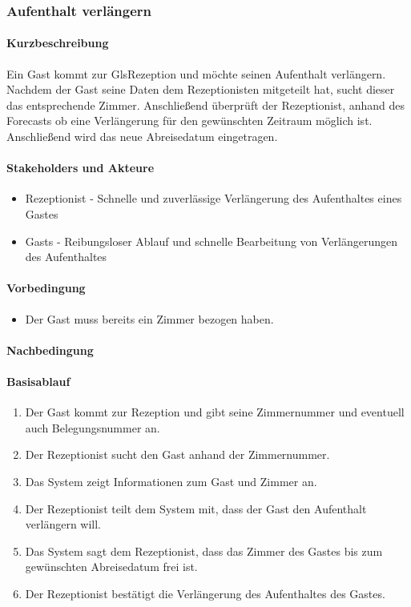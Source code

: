 \subsubsection{Aufenthalt verlängern}

\paragraph{Kurzbeschreibung}
Ein \Gls{Gast} kommt zur Gls{Rezeption} und möchte seinen Aufenthalt verlängern. Nachdem der \Gls{Gast} seine Daten dem \Gls{Rezeptionist}en mitgeteilt hat, sucht dieser das entsprechende Zimmer. Anschließend überprüft der \Gls{Rezeption}ist, anhand des Forecasts ob eine Verlängerung für den gewünschten Zeitraum möglich ist. Anschließend wird das neue Abreisedatum eingetragen.

\paragraph{Stakeholders und Akteure}
\begin{itemize}
\item \Gls{Rezeptionist} - Schnelle und zuverlässige Verlängerung des Aufenthaltes eines \Gls{Gast}es
\item \Glspl{Gast} - Reibungsloser Ablauf und schnelle Bearbeitung von Verlängerungen des Aufenthaltes
\end{itemize}

\paragraph{Vorbedingung}
\begin{itemize}
\item Der \Gls{Gast} muss bereits ein Zimmer bezogen haben.
\end{itemize}

\paragraph{Nachbedingung}

\paragraph{Basisablauf}
\begin{enumerate}
\item Der \Gls{Gast} kommt zur \Gls{Rezeption} und gibt seine \Gls{Zimmernummer} und eventuell auch \Gls{Belegungsnummer} an.
\item Der \Gls{Rezeptionist} sucht den Gast anhand der \Gls{Zimmernummer}.
\item Das System zeigt Informationen zum \Gls{Gast} und \Gls{Zimmer} an.
\item Der \Gls{Rezeptionist} teilt dem System mit, dass der \Gls{Gast} den Aufenthalt verlängern will.
\item Das System sagt dem \Gls{Rezeptionist}, dass das \Gls{Zimmer} des \Gls{Gast}es bis zum gewünschten Abreisedatum frei ist.
\item Der \Gls{Rezeptionist} bestätigt die Verlängerung des Aufenthaltes des \Gls{Gast}es.
\end{enumerate}

